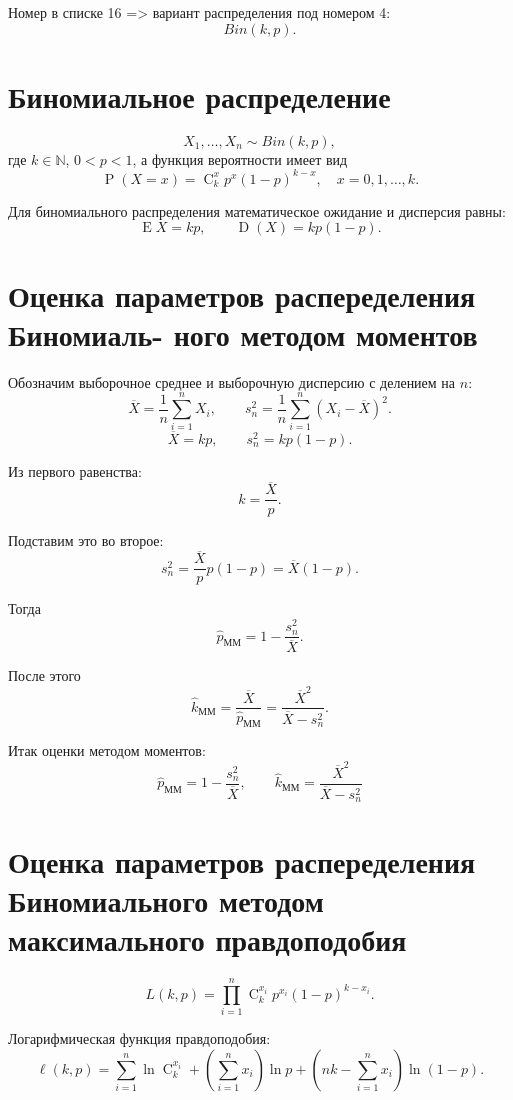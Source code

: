 \documentclass[a4paper,14pt]{extarticle}
\begin{document}
Номер в списке 16 => вариант распределения под номером 4:
\[
Bin(k,p).
\]


\section*{Биномиальное распределение}


\[
X_1,\dots,X_n \sim Bin(k,p),
\]
где \(k \in \mathbb{N}\), \(0<p<1\), а функция вероятности имеет вид
\[
\operatorname{P}(X=x)=\operatorname{C}_{k}^{x}p^x(1-p)^{k-x}, \quad x=0,1,\dots,k.
\]

Для биномиального распределения математическое ожидание и дисперсия равны:
\[
\operatorname{E}X = kp,
\qquad
\operatorname{D}(X)=kp(1-p).
\]

\section*{Оценка параметров распеределения Биномиаль-
ного методом  моментов}

Обозначим выборочное среднее и выборочную дисперсию с делением на \(n\):
\[
\overline{X}=\frac{1}{n}\sum_{i=1}^{n}X_i,
\qquad
s_n^2=\frac{1}{n}\sum_{i=1}^{n}(X_i-\overline{X})^2.
\]
\[
\overline{X}=kp,
\qquad
s_n^2=kp(1-p).
\]

Из первого равенства:
\[
k=\frac{\overline{X}}{p}.
\]

Подставим это во второе:
\[
s_n^2=\frac{\overline{X}}{p}p(1-p)=\overline{X}(1-p).
\]

Тогда
\[
\hat p_{\text{ММ}} = 1-\frac{s_n^2}{\overline{X}}.
\]

После этого
\[
\hat k_{\text{ММ}}=\frac{\overline{X}}{\hat p_{\text{ММ}}}
=
\frac{\overline{X}^2}{\overline{X}-s_n^2}.
\]

Итак оценки методом моментов:
\[
\boxed{
\hat p_{\text{ММ}} = 1-\frac{s_n^2}{\overline{X}},
\qquad
\hat k_{\text{ММ}} = \frac{\overline{X}^2}{\overline{X}-s_n^2}
}
\]

\section*{Оценка параметров распеределения Биномиального методом  максимального правдоподобия}

\[
L(k,p)=\prod_{i=1}^{n}\operatorname{C}_{k}^{x_i}p^{x_i}(1-p)^{k-x_i}.
\]

Логарифмическая функция правдоподобия:
\[
\ell(k,p)=
\sum_{i=1}^{n}\ln\operatorname{C}_{k}^{x_i}
+
\left(\sum_{i=1}^{n}x_i\right)\ln p
+
\left(nk-\sum_{i=1}^{n}x_i\right)\ln(1-p).
\]
\end{document}

